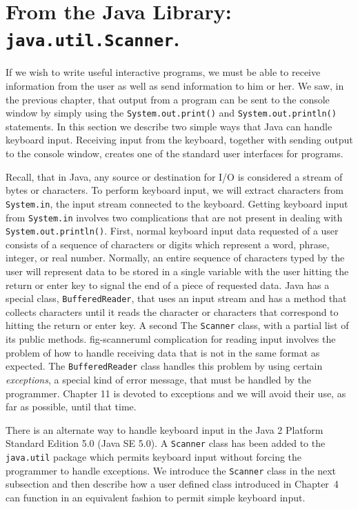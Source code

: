 \section{From the Java Library: {\tt java.util.Scanner}.}
\label{pg-sec-scannerclass}

If we wish to write useful interactive programs, we must be able to receive
information from the user as well as send information to him or her.  
We saw, in the previous chapter, that output from a program can
be sent to the console window by simply using the {\tt System.out.print()}
and {\tt System.out.println()} statements. In this section we describe two 
simple ways that Java can handle keyboard input. Receiving input from the keyboard,
together with sending output to the console window, creates one of the standard
user interfaces for programs.

Recall, that in Java, any source or destination for I/O is considered a 
stream of bytes or characters.  To perform keyboard input, we will extract
characters from {\tt System.in}, the input stream connected to the keyboard. 
Getting keyboard input from  {\tt System.in} involves two complications
that are not present in dealing with {\tt System.out.println()}.
First, normal keyboard input data requested of a user consists of a sequence
of characters or digits which represent a word, phrase, integer, or real 
number.  Normally, an entire sequence of characters typed by the user 
will represent data to be stored in a single variable with the user hitting 
the return or enter key to signal the end of a piece of requested data. Java has a
special class, {\tt BufferedReader}, that uses an input stream 
and has a method that collects characters until it reads the character or
characters that correspond to hitting the return or enter key. A second 
{The {\tt Scanner} class, with a
partial list of its public methods.}
{fig-scanneruml}
complication for reading input involves the problem of how to handle 
receiving data that is not in the same format as expected.  The 
{\tt BufferedReader} class handles this problem by using certain {\it exceptions},
a special kind of error message, that must be handled by the programmer.
Chapter 11 is devoted to exceptions and we will avoid their use, as far as
possible, until that time.

There is an alternate way to handle keyboard input in the Java 2
Platform Standard Edition 5.0 (Java SE 5.0). A {\tt Scanner} class has
been added to the {\tt java.util} package which permits keyboard input
without forcing the programmer to handle exceptions.  We introduce the
{\tt Scanner} class in the next subsection and then describe how a
user defined class introduced in Chapter~4 can function in an
equivalent fashion to permit simple keyboard input.

